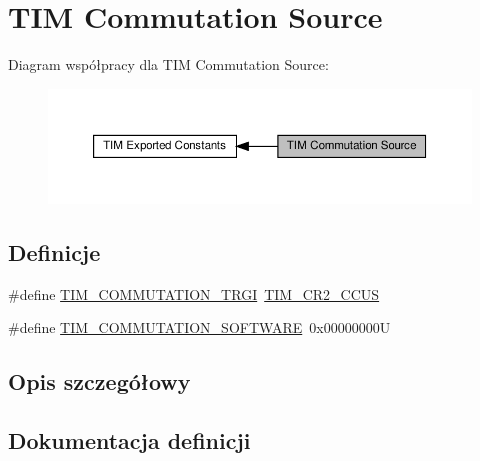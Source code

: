 \hypertarget{group___t_i_m___commutation___source}{}\section{T\+IM Commutation Source}
\label{group___t_i_m___commutation___source}
Diagram współpracy dla T\+IM Commutation Source\+:\nopagebreak
\begin{figure}[H]
\begin{center}
\leavevmode
\includegraphics[width=350pt]{group___t_i_m___commutation___source}
\end{center}
\end{figure}
\subsection*{Definicje}
\begin{DoxyCompactItemize}
\item 
\#define \hyperlink{group___t_i_m___commutation___source_gab2e11763b5e061a5b3056ac970f57ab1}{T\+I\+M\+\_\+\+C\+O\+M\+M\+U\+T\+A\+T\+I\+O\+N\+\_\+\+T\+R\+GI}~\hyperlink{group___peripheral___registers___bits___definition_gaf0328c1339b2b1633ef7a8db4c02d0d5}{T\+I\+M\+\_\+\+C\+R2\+\_\+\+C\+C\+US}
\item 
\#define \hyperlink{group___t_i_m___commutation___source_ga9cd117a69cbca219c1cf29e74746a496}{T\+I\+M\+\_\+\+C\+O\+M\+M\+U\+T\+A\+T\+I\+O\+N\+\_\+\+S\+O\+F\+T\+W\+A\+RE}~0x00000000U
\end{DoxyCompactItemize}


\subsection{Opis szczegółowy}


\subsection{Dokumentacja definicji}
\mbox{\label{group___t_i_m___commutation___source_ga9cd117a69cbca219c1cf29e74746a496}} 
